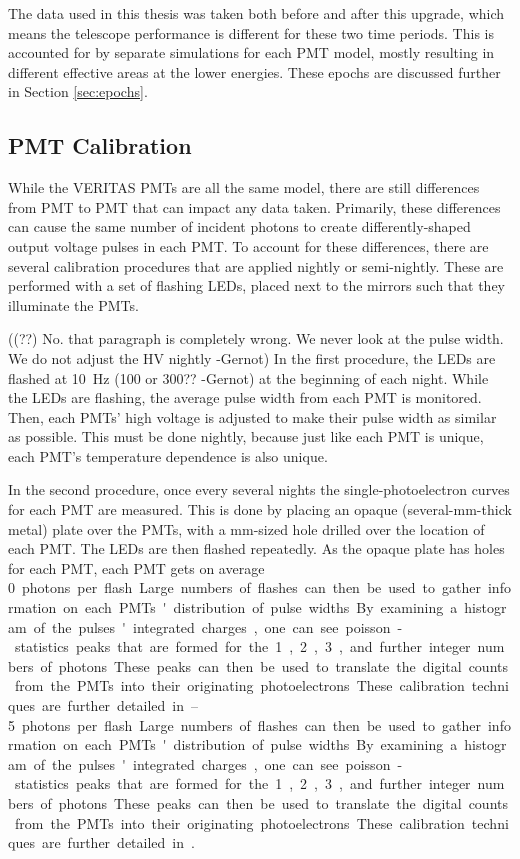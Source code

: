 The data used in this thesis was taken both before and after this upgrade, which means the telescope performance is different for these two time periods.
This is accounted for by separate simulations for each PMT model, mostly resulting in different effective areas at the lower energies.
These epochs are discussed further in Section \ref{sec:epochs}.


\subsection{PMT Calibration}

While the VERITAS PMTs are all the same model, there are still differences from PMT to PMT that can impact any data taken.
Primarily, these differences can cause the same number of incident photons to create differently-shaped output voltage pulses in each PMT.
To account for these differences, there are several calibration procedures that are applied nightly or semi-nightly.
These are performed with a set of flashing LEDs, placed next to the mirrors such that they illuminate the PMTs.

{\color{red}((??) No. that paragraph is completely wrong. We never look at the pulse width. We do not adjust the HV nightly -Gernot)}
In the first procedure, the LEDs are flashed at \nicetilde{}\SI{10}{Hz} {\color{red}(100 or 300?? -Gernot)} at the beginning of each night.
While the LEDs are flashing, the average pulse width from each PMT is monitored.
Then, each PMTs' high voltage is adjusted to make their pulse width as similar as possible.
This must be done nightly, because just like each PMT is unique, each PMT's temperature dependence is also unique.

In the second procedure, once every several nights the single-photoelectron curves for each PMT are measured.
This is done by placing an opaque (several-mm-thick metal) plate over the PMTs, with a mm-sized hole drilled over the location of each PMT.
The LEDs are then flashed repeatedly.
As the opaque plate has holes for each PMT, each PMT gets on average \SIrange{0}{5} photons per flash.
Large numbers of flashes can then be used to gather information on each PMTs' distribution of pulse widths.
By examining a histogram of the pulses' integrated charges, one can see poisson-statistics peaks that are formed for the 1, 2, 3, and further integer numbers of photons.
These peaks can then be used to translate the digital counts from the PMTs into their originating photoelectrons.
These calibration techniques are further detailed in \cite{calib_techniques}.

